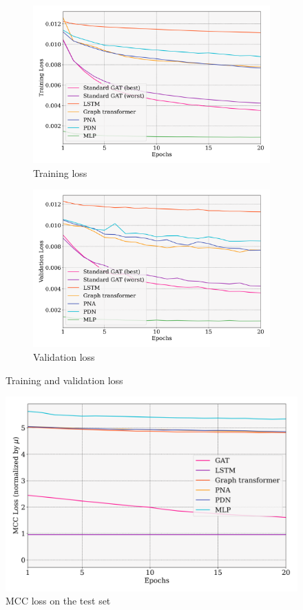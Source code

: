 \documentclass[switch, 11pt]{article}
\begin{document}
\begin{figure}[H]
    \centering
    \begin{subfigure}{0.49\columnwidth}
        \centering
        \includegraphics[width=0.99\columnwidth]{figures/train_loss.png}
        \caption{Training loss}
        \label{fig:train_loss}
    \end{subfigure}
    \begin{subfigure}{0.49\columnwidth}
        \centering
        \includegraphics[width=0.99\columnwidth]{figures/val_loss.png}
        \caption{Validation loss}
        \label{fig:val_loss}
    \end{subfigure}
    \caption{Training and validation loss}
\end{figure}

\begin{figure}[H]
    \centering
    \includegraphics[width=0.5\columnwidth]{figures/mcc_loss.png}
    \caption{MCC loss on the test set}
    \label{fig:mcc_loss}
\end{figure}
\end{document}
